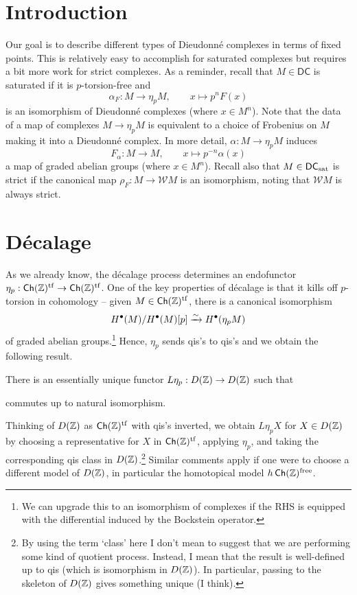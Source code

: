 \documentclass[11pt]{article}
\newcommand{\DC}{\mathsf{DC}} %
\newcommand{\free}{\textup{free}} %
\newcommand{\sat}{\textup{sat}} %
\newcommand{\W}{\mathcal{W}}
\begin{document}
\section{Introduction}
Our goal is to describe different types of Dieudonn\'{e} complexes in terms of fixed points. This is relatively easy to accomplish for saturated complexes but requires a bit more work for strict complexes. As a reminder, recall that $M\in\DC$ is saturated if it is $p$-torsion-free and 
$$\alpha_F: M\to\eta_pM,\qquad x\mapsto p^nF(x)$$
is an isomorphism of Dieudonn\'{e} complexes (where $x\in M^n$). Note that the data of a map of complexes $M\to\eta_pM$ is equivalent to a choice of Frobenius on $M$ making it into a Dieudonn\'{e} complex. In more detail, $\alpha: M\to\eta_pM$ induces
$$F_{\alpha}: M\to M,\qquad x\mapsto p^{-n}\alpha(x)$$
a map of graded abelian groups (where $x\in M^n$). Recall also that $M\in\DC_{\sat}$ is strict if the canonical map $\rho_F: M\to\W M$ is an isomorphism, noting that $\W M$ is always strict. 

\section{D\'{e}calage}
As we already know, the d\'{e}calage process determines an endofunctor $\eta_p: \operatorname{\mathsf{Ch}}(\mathbb{Z})^{\operatorname{tf}}\to\operatorname{\mathsf{Ch}}(\mathbb{Z})^{\operatorname{tf}}$. One of the key properties of d\'{e}calage is that it kills off $p$-torsion in cohomology -- given $M\in\operatorname{\mathsf{Ch}}(\mathbb{Z})^{\operatorname{tf}}$, there is a canonical isomorphism 
$$H^{\bullet}(M)/H^{\bullet}(M)[p]\xrightarrow{\sim}H^{\bullet}(\eta_pM)$$
of graded abelian groups.\footnote{We can upgrade this to an isomorphism of complexes if the RHS is equipped with the differential induced by the Bockstein operator.} Hence, $\eta_p$ sends qis's to qis's and we obtain the following result.

\begin{proposition}
There is an essentially unique functor $L\eta_p: D(\mathbb{Z})\to D(\mathbb{Z})$ such that
\begin{center}
\end{center}
commutes up to natural isomorphism.
\end{proposition}

Thinking of $D(\mathbb{Z})$ as $\operatorname{\mathsf{Ch}}(\mathbb{Z})^{\operatorname{tf}}$ with qis's inverted, we obtain $L\eta_pX$ for $X\in D(\mathbb{Z})$ by choosing a representative for $X$ in $\operatorname{\mathsf{Ch}}(\mathbb{Z})^{\operatorname{tf}}$, applying $\eta_p$, and taking the corresponding qis class in $D(\mathbb{Z})$.\footnote{By using the term `class' here I don't mean to suggest that we are performing some kind of quotient process. Instead, I mean that the result is well-defined up to qis (which is isomorphism in $D(\mathbb{Z})$). In particular, passing to the skeleton of $D(\mathbb{Z})$ gives something unique (I think).} Similar comments apply if one were to choose a different model of $D(\mathbb{Z})$, in particular the homotopical model $h\Ch(\Z)^{\free}$.
\end{document}
